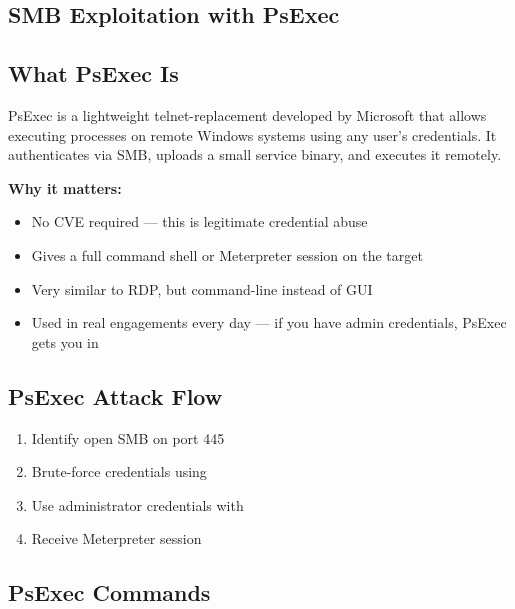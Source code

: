 \begin{notebox}


\section{SMB Exploitation with PsExec}
\label{sec:smb_psexec}

\subsection{What PsExec Is}

PsExec is a lightweight telnet-replacement developed by Microsoft that allows
executing processes on remote Windows systems using any user's credentials. It
authenticates via SMB, uploads a small service binary, and executes it remotely.

\textbf{Why it matters:}
\begin{itemize}
  \item No CVE required --- this is legitimate credential abuse
  \item Gives a full command shell or Meterpreter session on the target
  \item Very similar to RDP, but command-line instead of GUI
  \item Used in real engagements every day --- if you have admin credentials,
        PsExec gets you in
\end{itemize}

\subsection{PsExec Attack Flow}

\begin{enumerate}
  \item Identify open SMB on port 445
  \item Brute-force credentials using 
  \item Use administrator credentials with 
  \item Receive Meterpreter session
\end{enumerate}

\subsection{PsExec Commands}


\end{notebox}

